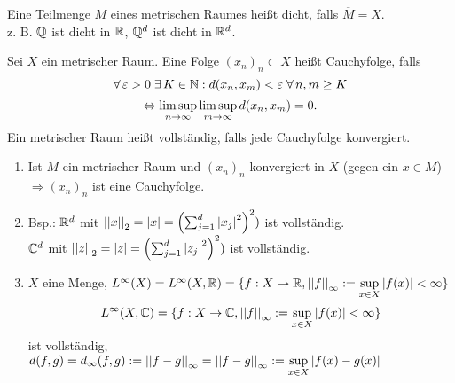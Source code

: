 \documentclass[../ana2.tex]{subfiles}
\begin{document}
\begin{defi}
    Eine Teilmenge \(M\) eines metrischen Raumes heißt
    dicht, falls \(\overline{M} = X\).\\
    z. B. \( \mathbb{Q} \) ist dicht in \( \mathbb{R} \), 
    \( \mathbb{Q}^d \) ist dicht in \( \mathbb{R}^d \).
\end{defi}
\begin{defi}[Cauchyfolge]
    Sei \( X \) ein metrischer Raum. 
    Eine Folge \( (x_n)_n \subset X \) heißt 
    Cauchyfolge, falls
    \[ \forall \varepsilon > 0 \; \exists K \in \N: 
    d(x_n, x_m) < \varepsilon \; \forall n,m \geq K \]
    \[ \Leftrightarrow \limsup\limits_{n\rightarrow\infty} \limsup\limits_{m\rightarrow\infty} 
    d(x_n, x_m) = 0. \]
    Ein metrischer Raum heißt vollständig, falls jede 
    Cauchyfolge konvergiert.
\end{defi}
\begin{bem}\leavevmode
    \begin{enumerate}
        \item Ist \( M \) ein metrischer Raum 
        und \( (x_n)_n \) konvergiert in \( X \)
        (gegen ein \( x \in M \)) 
        \( \Rightarrow (x_n)_n \) ist eine 
        Cauchyfolge.
        \item Bsp.: \( \mathbb{R}^d \) mit \( \left|\left|x\right|\right|_2 = \left|x\right| 
        = \left( \sum_{j=1}^d \left|x_j\right|^2 \right)^2) \)
        ist vollständig. \\
        \( \mathbb{C}^d \) mit \( \left|\left|z\right|\right|_2 = \left|z\right| 
        = \left( \sum_{j=1}^d \left|z_j\right|^2 \right)^2) \)
        ist vollständig.
        \item \( X \) eine Menge, 
        \( L^\infty(X) = L^\infty(X, \mathbb{R}) 
        = \{ f:X\rightarrow \mathbb{R}, 
        \left|\left|f\right|\right|_\infty 
        := \underset{x \in X}{\sup} \left|f(x)\right| < \infty \} \)
        \[ L^\infty(X, \mathbb{C}) 
        = \{ f:X\rightarrow \mathbb{C}, 
        \left|\left|f\right|\right|_\infty 
        := \underset{x \in X}{\sup} \left|f(x)\right| < \infty \} \]
        ist vollständig, \( d(f,g) = d_\infty(f,g) 
        := \left|\left|f-g\right|\right|_\infty = \left|\left|f-g\right|\right|_\infty 
        := \underset{x\in X}{\sup} \left|f(x) - g(x)\right| \)
    \end{enumerate}
\end{bem}
\end{document}
